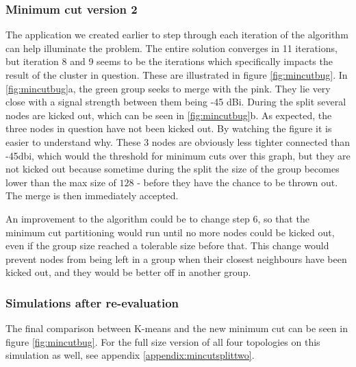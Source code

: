 \subsubsection{Minimum cut version 2}
The application we created earlier to step through each iteration of the algorithm can help illuminate the problem. The entire solution converges in 11 iterations, but iteration 8 and 9 seems to be the iterations which specifically impacts the result of the cluster in question.
These are illustrated in figure \ref{fig:mincutbug}. In \ref{fig:mincutbug}a, the green group seeks to merge with the pink. They lie very close with a signal strength between them being -45 dBi.
During the split several nodes are kicked out, which can be seen in \ref{fig:mincutbug}b. As expected, the three nodes in question have not been kicked out. By watching the figure it is easier to understand why.
These 3 nodes are obviously less tighter connected than -45dbi, which would the threshold for minimum cuts over this graph, but they are not kicked out because sometime during the split the size of the group becomes lower than the max size of $128$ - before they have the chance to be thrown out. The merge is then immediately accepted. 

An improvement to the algorithm could be to change step 6, so that the minimum cut partitioning would run until no more nodes could be kicked out, even if the group size reached a tolerable size before that. This change would prevent nodes from being left in a group when their closest neighbours have been kicked out, and they would be better off in another group.

\subsubsection{Simulations after re-evaluation}
The final comparison between K-means and the new minimum cut can be seen in figure \ref{fig:mincutbug}. For the full size version of
all four topologies on this simulation as well, see appendix \ref{appendix:mincutsplittwo}. 

